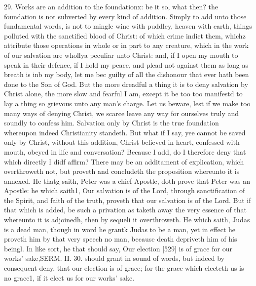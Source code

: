 29. Works are an addition to the foundationx: be it so, what then? the foundation is not subverted by every kind of addition. Simply to add unto those fundamental words, is not to mingle wine with puddley, heaven with earth, things polluted with the sanctified blood of Christ: of which crime indict them, whichz attribute those operations in whole or in part to any creature, which in the work of our salvation are whollya peculiar unto Christ: and, if I open my mouth to speak in their defence, if I hold my peace, and plead not against them as long as breath is inb my body, let me bec guilty of all the dishonour that ever hath been done to the Son of God. But the more dreadful a thing it is to deny salvation by Christ alone, the more slow and fearful I am, except it be too too manifestd to lay a thing so grievous unto any man’s charge. Let us beware, lest if we make too many ways of denying Christ, we scarce leave any way for ourselves truly and soundly to confess him. Salvation only by Christ is the true foundation whereupon indeed Christianity standeth. But what if I say, yee cannot be saved only by Christ, without this addition, Christ believed in heart, confessed with mouth, obeyed in life and conversation? Because I add, do I therefore deny that which directly I didf affirm? There may be an additament of explication, which overthroweth not, but proveth and concludeth the proposition whereunto it is annexed. He thatg saith, Peter was a chief Apostle, doth prove that Peter was an Apostle: he which saith1, Our salvation is of the Lord, through sanctification of the Spirit, and faith of the truth, proveth that our salvation is of the Lord. But if that which is added, be such a privation as taketh away the very essence of that whereunto it is adjoinedh, then by sequeli it overthroweth. He which saith, Judas is a dead man, though in word he grantk Judas to be a man, yet in effect he proveth him by that very speech no man, because death depriveth him of his beingl. In like sort, he that should say, Our election [529] is of grace for our works’ sake,SERM. II. 30. should grant in sound of words, but indeed by consequent deny, that our election is of grace; for the grace which electeth us is no grace1, if it elect us for our works’ sake.


